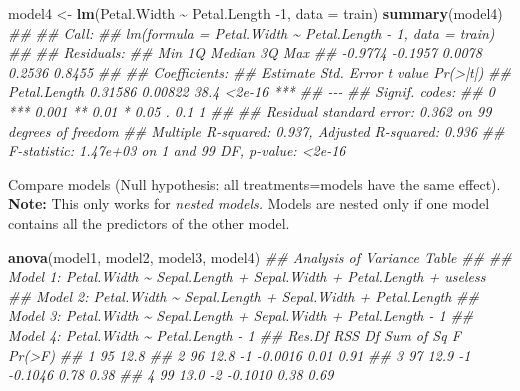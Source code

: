 \documentclass[
  notitlepage]{book}
\newenvironment{Shaded}{\begin{snugshade}}{\end{snugshade}}
\newcommand{\CommentTok}[1]{\textcolor[rgb]{0.56,0.35,0.01}{\textit{#1}}}
\newcommand{\DataTypeTok}[1]{\textcolor[rgb]{0.13,0.29,0.53}{#1}}
\newcommand{\DecValTok}[1]{\textcolor[rgb]{0.00,0.00,0.81}{#1}}
\newcommand{\KeywordTok}[1]{\textcolor[rgb]{0.13,0.29,0.53}{\textbf{#1}}}
\newcommand{\NormalTok}[1]{#1}
\newcommand{\OperatorTok}[1]{\textcolor[rgb]{0.81,0.36,0.00}{\textbf{#1}}}
\newcommand{\StringTok}[1]{\textcolor[rgb]{0.31,0.60,0.02}{#1}}
\begin{document}
\begin{Shaded}
\begin{Highlighting}[]
\NormalTok{model4 \textless{}{-}}\StringTok{ }\KeywordTok{lm}\NormalTok{(Petal.Width }\OperatorTok{\textasciitilde{}}\StringTok{ }\NormalTok{Petal.Length }\DecValTok{{-}1}\NormalTok{,}
             \DataTypeTok{data =}\NormalTok{ train)}
\KeywordTok{summary}\NormalTok{(model4)}
\CommentTok{\#\# }
\CommentTok{\#\# Call:}
\CommentTok{\#\# lm(formula = Petal.Width \textasciitilde{} Petal.Length {-} 1, data = train)}
\CommentTok{\#\# }
\CommentTok{\#\# Residuals:}
\CommentTok{\#\#     Min      1Q  Median      3Q     Max }
\CommentTok{\#\# {-}0.9774 {-}0.1957  0.0078  0.2536  0.8455 }
\CommentTok{\#\# }
\CommentTok{\#\# Coefficients:}
\CommentTok{\#\#              Estimate Std. Error t value Pr(\textgreater{}|t|)    }
\CommentTok{\#\# Petal.Length  0.31586    0.00822    38.4   \textless{}2e{-}16 ***}
\CommentTok{\#\# {-}{-}{-}}
\CommentTok{\#\# Signif. codes:  }
\CommentTok{\#\# 0 \textquotesingle{}***\textquotesingle{} 0.001 \textquotesingle{}**\textquotesingle{} 0.01 \textquotesingle{}*\textquotesingle{} 0.05 \textquotesingle{}.\textquotesingle{} 0.1 \textquotesingle{} \textquotesingle{} 1}
\CommentTok{\#\# }
\CommentTok{\#\# Residual standard error: 0.362 on 99 degrees of freedom}
\CommentTok{\#\# Multiple R{-}squared:  0.937,  Adjusted R{-}squared:  0.936 }
\CommentTok{\#\# F{-}statistic: 1.47e+03 on 1 and 99 DF,  p{-}value: \textless{}2e{-}16}
\end{Highlighting}
\end{Shaded}

Compare models (Null hypothesis: all treatments=models have the same effect). \textbf{Note:} This only works for \emph{nested models.} Models are nested only if one model contains all the predictors of the other model.

\begin{Shaded}
\begin{Highlighting}[]
\KeywordTok{anova}\NormalTok{(model1, model2, model3, model4)}
\CommentTok{\#\# Analysis of Variance Table}
\CommentTok{\#\# }
\CommentTok{\#\# Model 1: Petal.Width \textasciitilde{} Sepal.Length + Sepal.Width + Petal.Length + useless}
\CommentTok{\#\# Model 2: Petal.Width \textasciitilde{} Sepal.Length + Sepal.Width + Petal.Length}
\CommentTok{\#\# Model 3: Petal.Width \textasciitilde{} Sepal.Length + Sepal.Width + Petal.Length {-} 1}
\CommentTok{\#\# Model 4: Petal.Width \textasciitilde{} Petal.Length {-} 1}
\CommentTok{\#\#   Res.Df  RSS Df Sum of Sq    F Pr(\textgreater{}F)}
\CommentTok{\#\# 1     95 12.8                         }
\CommentTok{\#\# 2     96 12.8 {-}1   {-}0.0016 0.01   0.91}
\CommentTok{\#\# 3     97 12.9 {-}1   {-}0.1046 0.78   0.38}
\CommentTok{\#\# 4     99 13.0 {-}2   {-}0.1010 0.38   0.69}
\end{Highlighting}
\end{Shaded}
\end{document}
